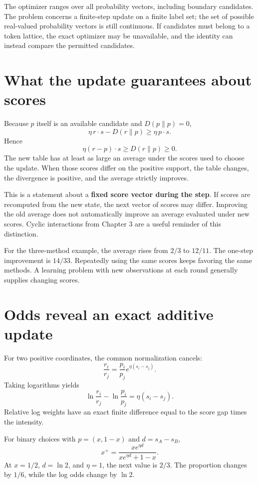 \documentclass[11pt,oneside,openany]{book}
\theoremstyle{definition}
\theoremstyle{remark}
\numberwithin{equation}{chapter}
\begin{document}
The optimizer ranges over all probability vectors, including boundary candidates. The problem concerns a finite-step update on a finite label set; the set of possible real-valued probability vectors is still continuous. If candidates must belong to a token lattice, the exact optimizer may be unavailable, and the identity can instead compare the permitted candidates.

\section{What the update guarantees about scores}\label{ch09-what-the-update-guarantees-about-scores}

Because \(p\) itself is an available candidate and \(D(p\|p)=0\), \[\eta\,r\cdot s-D(r\|p)\geq\eta\,p\cdot s.\] Hence \[\boxed{\eta(r-p)\cdot s\geq D(r\|p)\geq0.}\] The new table has at least as large an average under the scores used to choose the update. When those scores differ on the positive support, the table changes, the divergence is positive, and the average strictly improves.

This is a statement about a \textbf{fixed score vector during the step}. If scores are recomputed from the new state, the next vector of scores may differ. Improving the old average does not automatically improve an average evaluated under new scores. Cyclic interactions from Chapter 3 are a useful reminder of this distinction.

For the three-method example, the average rises from \(2/3\) to \(12/11\). The one-step improvement is \(14/33\). Repeatedly using the same scores keeps favoring the same methods. A learning problem with new observations at each round generally supplies changing scores.

\section{Odds reveal an exact additive update}\label{ch09-odds-reveal-an-exact-additive-update}

For two positive coordinates, the common normalization cancels: \[\frac{r_i}{r_j}=\frac{p_i}{p_j}e^{\eta(s_i-s_j)}.\] Taking logarithms yields \[\boxed{\ln\frac{r_i}{r_j}-\ln\frac{p_i}{p_j}
=\eta(s_i-s_j).}\] Relative log weights have an exact finite difference equal to the score gap times the intensity.

For binary choices with \(p=(x,1-x)\) and \(d=s_A-s_B\), \[x^+=\frac{xe^{\eta d}}{xe^{\eta d}+1-x}.\] At \(x=1/2\), \(d=\ln2\), and \(\eta=1\), the next value is \(2/3\). The proportion changes by \(1/6\), while the log odds change by \(\ln2\).
\end{document}
